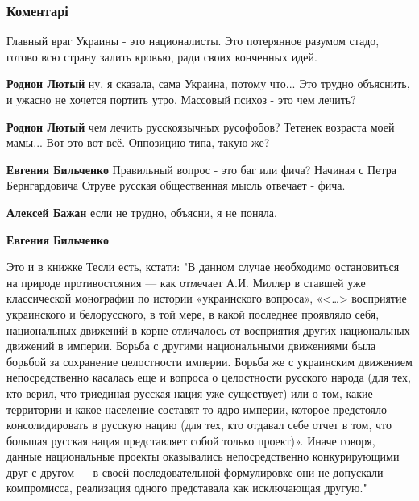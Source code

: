  
 
 
 
 
\subsubsection{Коментарі}
\label{sec:18_10_2021.fb.bilchenko_evgenia.1.ukr_oppozicia.cmt}

\begin{itemize} %
Главный враг Украины - это националисты. Это потерянное разумом стадо, готово всю страну залить кровью, ради своих конченных идей.

\begin{itemize} %
\textbf{Родион Лютый} ну, я сказала, сама Украина, потому что... Это трудно объяснить, и ужасно не хочется портить утро. Массовый психоз - это чем лечить?

\textbf{Родион Лютый} чем лечить русскоязычных русофобов? Тетенек возраста моей мамы... Вот это вот всё. Оппозицию типа, такую же?

\textbf{Евгения Бильченко} Правильный вопрос - это баг или фича? Начиная с Петра Бернгардовича Струве русская общественная мысль отвечает - фича.

\textbf{Алексей Бажан} если не трудно, объясни, я не поняла.

\textbf{Евгения Бильченко} 

Это и в книжке Тесли есть, кстати: "В данном случае необходимо остановиться на
природе противостояния — как отмечает А.И. Миллер в ставшей уже классической
монографии по истории «украинского вопроса», «<…> восприятие украинского и
белорусского, в той мере, в какой последнее проявляло себя, национальных
движений в корне отличалось от восприятия других национальных движений в
империи. Борьба с другими национальными движениями была борьбой за сохранение
целостности империи. Борьба же с украинским движением непосредственно касалась
еще и вопроса о целостности русского народа (для тех, кто верил, что триединая
русская нация уже существует) или о том, какие территории и какое население
составят то ядро империи, которое предстояло консолидировать в русскую нацию
(для тех, кто отдавал себе отчет в том, что большая русская нация представляет
собой только проект)». Иначе говоря, данные национальные проекты оказывались
непосредственно конкурирующими друг с другом — в своей последовательной
формулировке они не допускали компромисса, реализация одного представала как
исключающая другую."


\end{itemize}
\end{itemize}
